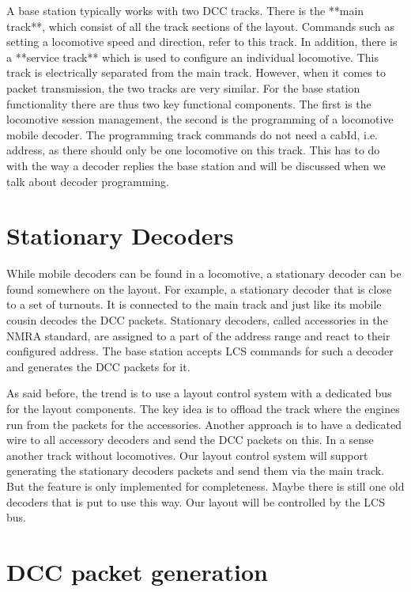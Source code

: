A base station typically works with two DCC tracks. There is the **main track**, which consist of all the track sections of the layout. Commands such as setting a locomotive speed and direction, refer to this track. In addition, there is a **service track** which is used to configure an individual locomotive. This track is electrically separated from the main track. However, when it comes to packet transmission, the two tracks are very similar. For the base station functionality there are thus two key functional components. The first is the locomotive session management, the second is the programming of a locomotive mobile decoder. The programming track commands do not need a cabId, i.e. address, as there should only be one locomotive on this track. This has to do with the way a decoder replies the base station and will be discussed when we talk about decoder programming.

\section{Stationary Decoders}

While mobile decoders can be found in a locomotive, a stationary decoder can be found somewhere on the layout. For example, a stationary decoder that is close to a set of turnouts. It is connected to the main track and just like its mobile cousin decodes the DCC packets. Stationary decoders, called accessories in the NMRA standard, are assigned to a part of the address range and react to their configured address. The base station accepts LCS commands for such a decoder and generates the DCC packets for it.

As said before, the trend is to use a layout control system with a dedicated bus for the layout components. The key idea is to offload the track where the engines run from the packets for the accessories. Another approach is to have a dedicated wire to all accessory decoders and send the DCC packets on this. In a sense another track without locomotives. Our layout control system will support generating the stationary decoders packets and send them via the main track.  But the feature is only implemented for completeness. Maybe there is still one old decoders that is put to use this way. Our layout will be controlled by the LCS bus.

\section{DCC packet generation}

